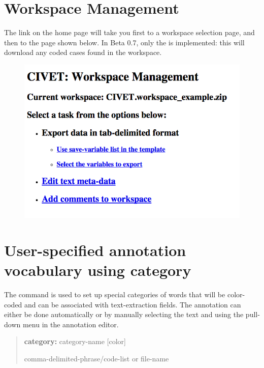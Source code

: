 \documentclass[letterpaper,10pt,english]{sphinxmanual}
\begin{document}
\section{Workspace Management}
\label{workspaces:workspace-management}\label{workspaces:sec-management}
The  link on the home page will take you first to a
workspace selection page, and then to the page shown below. In Beta 0.7, only the
is implemented: this will download any coded cases found in the
workspace.
\begin{figure}[htbp]
\centering

\includegraphics{manage.png}
\end{figure}


\section{User-specified annotation vocabulary using \textbf{category}}
\label{workspaces:sec-categories}\label{workspaces:user-specified-annotation-vocabulary-using-category}
The  command is used to set up special categories of words
that will be color-coded and can be associated with text-extraction
fields. The annotation can either be done automatically or by manually
selecting the text and using the  pull-down menu in the
annotation editor.
\begin{quote}

\begin{DUlineblock}{0em}
\item[] \textbf{category:} category-name {[}color{]}
\item[] comma-delimited-phrase/code-list or file-name
\end{DUlineblock}
\end{quote}
\end{document}
